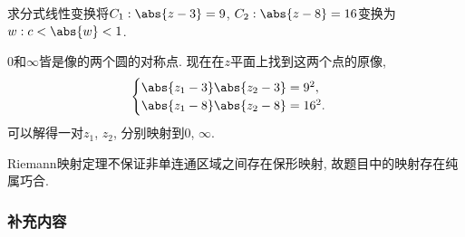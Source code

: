 \documentclass[../ComplexVariable.tex]{subfiles}
\begin{document}
\begin{sample}
    \begin{ex}
        求分式线性变换将$C_1: \abs{z-3} = 9$, $C_2: \abs{z-8} = 16$变换为$w: c<\abs{w}<1$.
    \end{ex}
    \begin{solution}
        $0$和$\infty$皆是像的两个圆的对称点. 现在在$z$平面上找到这两个点的原像,
        \[ \begin{cases}
            \abs{z_1-3}\abs{z_2-3} = 9^2,\\
            \abs{z_1-8}\abs{z_2-8} = 16^2.
        \end{cases} \]
        可以解得一对$z_1$, $z_2$, 分别映射到$0$, $\infty$.
    \end{solution}
    \begin{remark}
        Riemann映射定理不保证非单连通区域之间存在保形映射, 故题目中的映射存在纯属巧合.
    \end{remark}
\end{sample}

\subsubsection{补充内容} %
\label{ssub:补充内容}
\end{document}
